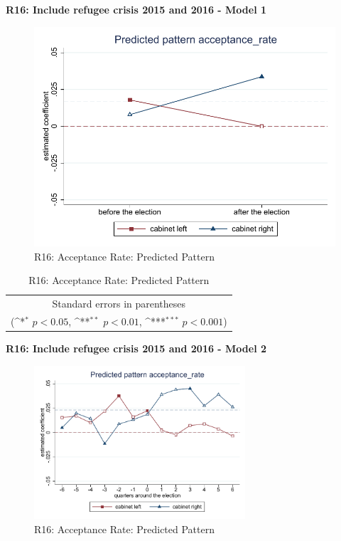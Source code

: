\documentclass[10pt,a4paper]{scrartcl}
\begin{document}
\clearpage
\textbf{R16: Include refugee crisis 2015 and 2016 - Model 1}
\begin{figure}[!ht]
	\centering
	\includegraphics[width=1\textwidth]{figures_edited/acceptance_rate_graph1_R16.pdf}
	\caption{R16: Acceptance Rate: Predicted Pattern}
\end{figure}

\begin{table}[!ht]\centering
	\renewcommand{\arraystretch}{1.25}
	\def\sym#1{\ifmmode^{#1}\else\(^{#1}\)\fi}
	\caption{R16: Acceptance Rate: Predicted Pattern}
	\begin{tabular}{l*{2}{c}}
		\hline\hline
		
		\hline\hline
		\multicolumn{3}{c}{\footnotesize Standard errors in parentheses} \\
		\multicolumn{3}{c}{\footnotesize (\sym{*} \(p<0.05\), \sym{**} \(p<0.01\), \sym{***} \(p<0.001\))}\\
	\end{tabular}
\end{table}

\clearpage
\textbf{R16: Include refugee crisis 2015 and 2016 - Model 2}
\begin{figure}[!ht]
	\centering
	\includegraphics[width=0.7\textwidth]{figures_edited/acceptance_rate_graph2_R16.pdf}
	\caption{R16: Acceptance Rate: Predicted Pattern}
\end{figure}
\end{document}
